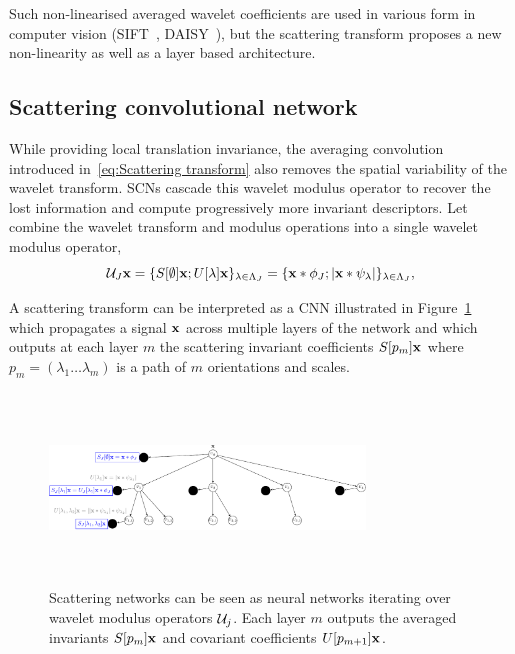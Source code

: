 \documentclass{article}
\begin{document}
    Such non-linearised averaged wavelet coefficients are used in various form in computer vision (SIFT~\citep{sift}, DAISY~\citep{daisy}), but the scattering transform proposes a new non-linearity as well as a layer based architecture.
  
  \subsection{Scattering convolutional network}
    \label{subsec:SCN/SCN}
    
    While providing local translation invariance, the averaging convolution introduced in~\ref{eq:Scattering transform} also removes the spatial variability of the wavelet transform. SCNs cascade this wavelet modulus operator to recover the lost information and compute progressively more invariant descriptors. Let combine the wavelet transform and modulus operations into a single wavelet modulus operator,
    \vspace{-5pt}
    \begin{equation}
      \mathcal{U}_{J} {\bf x} = \{ S[\emptyset] {\bf x} ; U[\lambda]{\bf x} \}_{\lambda \in \Lambda_{J}} 
          = \{ {\bf x} \ast \phi_{J}; \left| {\bf x} \ast \psi_{\lambda} \right| \}_{\lambda \in \Lambda_{J}},
      \label{eq:One step propagator}
    \end{equation}
    
    A scattering transform can be interpreted as a CNN illustrated in Figure~\ref{fig:SCN 1}~\citep{Deep Roto-Translation Scattering for Object Classification} which propagates a signal ${\bf x}$ across multiple layers of the network and which outputs at each layer $m$ the scattering invariant coefficients $S[p_{m}]{\bf x}$ where $p_{m}=(\lambda_{1} \dots \lambda_{m})$ is a path of $m$ orientations and scales.
    
    \begin{figure}
      \begin{center}
        \includegraphics[width=3.3in, height=2in, keepaspectratio]{ST_freqDec_crop.pdf}
        \caption[Scattering convolution network.]{\centering  Scattering networks can be seen as neural networks iterating over wavelet  modulus  operators $\mathcal{U}_{j}$. Each layer $m$ outputs the averaged  invariants $S[p_{m}]{\bf x}$ and covariant coefficients $U[p_{m+1}]{\bf x}$.}
        \label{fig:SCN 1}
      \end{center}
      \vspace{-15pt}
    \end{figure}
    
\end{document}
